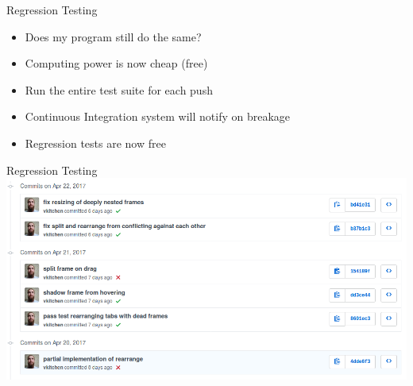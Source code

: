 \documentclass{beamer}
\begin{document}

\begin{frame}{Regression Testing}
	\begin{itemize}
		\item Does my program still do the same?
		\item Computing power is now cheap (free)
		\item Run the entire test suite for each push
		\item Continuous Integration system will notify on breakage
		\item Regression tests are now free
	\end{itemize}
\end{frame}

\begin{frame}{Regression Testing}
	\includegraphics[width=\linewidth]{regression.png}
\end{frame}
\end{document}
